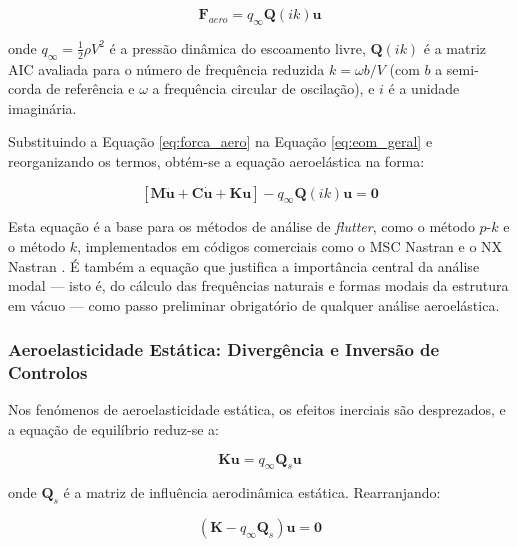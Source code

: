 \documentclass[a4paper,fleqn,noprintline]{cas-dc}
\begin{document}
\begin{equation}
    \mathbf{F}_{aero} = q_\infty \mathbf{Q}(ik) \mathbf{u}
    \label{eq:forca_aero}
\end{equation}

\noindent onde $q_\infty = \frac{1}{2}\rho V^2$ é a pressão dinâmica do escoamento livre, $\mathbf{Q}(ik)$ é a matriz AIC avaliada para o número de frequência reduzida $k = \omega b / V$ (com $b$ a semi-corda de referência e $\omega$ a frequência circular de oscilação), e $i$ é a unidade imaginária.

Substituindo a Equação \eqref{eq:forca_aero} na Equação \eqref{eq:eom_geral} e reorganizando os termos, obtém-se a equação aeroelástica na forma:

\begin{equation}
    \left[ \mathbf{M}\ddot{\mathbf{u}} + \mathbf{C}\dot{\mathbf{u}} + 
    \mathbf{K}\mathbf{u} \right] - q_\infty \mathbf{Q}(ik)\mathbf{u} 
    = \mathbf{0}
    \label{eq:flutter_eq}
\end{equation}

Esta equação é a base para os métodos de análise de \textit{flutter}, como o método $p$-$k$ e o método $k$, implementados em códigos comerciais como o MSC Nastran e o NX Nastran \cite{Nastran2014}. É também a equação que justifica a importância central da análise modal --- isto é, do cálculo das frequências naturais e formas modais da estrutura em vácuo --- como passo preliminar obrigatório de qualquer análise aeroelástica.

\subsubsection{Aeroelasticidade Estática: Divergência e Inversão de 
Controlos}

Nos fenómenos de aeroelasticidade estática, os efeitos inerciais são desprezados, e a equação de equilíbrio reduz-se a:

\begin{equation}
    \mathbf{K}\mathbf{u} = q_\infty \mathbf{Q}_s \mathbf{u}
    \label{eq:static_aero}
\end{equation}

\noindent onde $\mathbf{Q}_s$ é a matriz de influência aerodinâmica estática. Rearranjando:

\begin{equation}
    \left( \mathbf{K} - q_\infty \mathbf{Q}_s \right) \mathbf{u} = 
    \mathbf{0}
    \label{eq:divergencia}
\end{equation}
\end{document}
